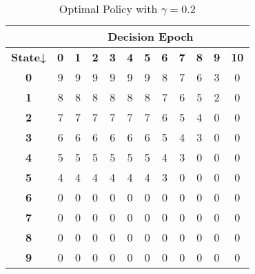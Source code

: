 \documentclass[11pt,a4paper,oneside]{report}
\begin{document}
\begin{table}[H]
\centering
\caption{Optimal Policy with $\gamma= 0.2$}
\label{t3}
\begin{tabular}{|c|c|c|c|c|c|c|c|c|c|c|c|}
\hline
\textbf{}       & \multicolumn{11}{c|}{\textbf{Decision Epoch}}                                                                                                 \\ \hline
\textbf{State↓} & \textbf{0} & \textbf{1} & \textbf{2} & \textbf{3} & \textbf{4} & \textbf{5} & \textbf{6} & \textbf{7} & \textbf{8} & \textbf{9} & \textbf{10} \\ \hline
\textbf{0}      & 9          & 9          & 9          & 9          & 9          & 9          & 8          & 7          & 6          & 3          & 0           \\ \hline
\textbf{1}      & 8          & 8          & 8          & 8          & 8          & 8          & 7          & 6          & 5          & 2          & 0           \\ \hline
\textbf{2}      & 7          & 7          & 7          & 7          & 7          & 7          & 6          & 5          & 4          & 0          & 0           \\ \hline
\textbf{3}      & 6          & 6          & 6          & 6          & 6          & 6          & 5          & 4          & 3          & 0          & 0           \\ \hline
\textbf{4}      & 5          & 5          & 5          & 5          & 5          & 5          & 4          & 3          & 0          & 0          & 0           \\ \hline
\textbf{5}      & 4          & 4          & 4          & 4          & 4          & 4          & 3          & 0          & 0          & 0          & 0           \\ \hline
\textbf{6}      & 0          & 0          & 0          & 0          & 0          & 0          & 0          & 0          & 0          & 0          & 0           \\ \hline
\textbf{7}      & 0          & 0          & 0          & 0          & 0          & 0          & 0          & 0          & 0          & 0          & 0           \\ \hline
\textbf{8}      & 0          & 0          & 0          & 0          & 0          & 0          & 0          & 0          & 0          & 0          & 0           \\ \hline
\textbf{9}      & 0          & 0          & 0          & 0          & 0          & 0          & 0          & 0          & 0          & 0          & 0           \\ \hline

\end{tabular}
\end{table}
\end{document}

